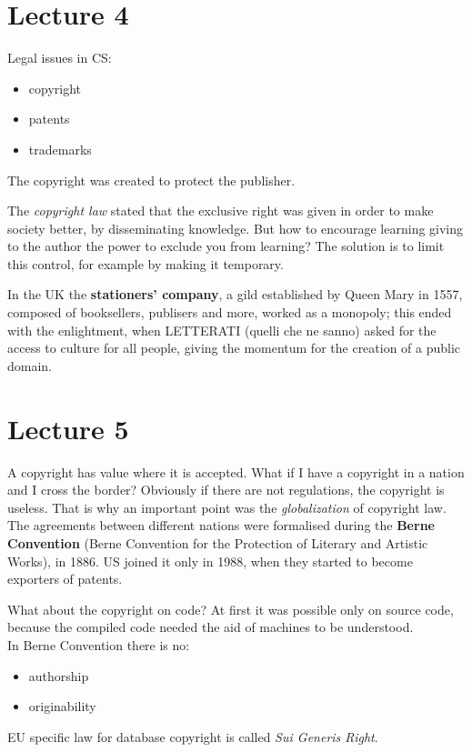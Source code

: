 \documentclass[a4paper, 10pt, titlepage]{article}
\begin{document}
\section{Lecture 4}
Legal issues in CS:
\begin{itemize}
\item copyright
\item patents
\item trademarks
\end{itemize}
The copyright was created to protect the publisher. 

The \textit{copyright law} stated that the exclusive right was given in order to make society better, by disseminating knowledge. But how to encourage learning giving to the author the power to exclude you from learning? The solution is to limit this control, for example by making it temporary.

In the UK the \textbf{stationers' company}, a gild established by Queen Mary in 1557, composed of booksellers, publisers and more, worked as a monopoly; this ended with the enlightment, when LETTERATI (quelli che ne sanno) asked for the access to culture for all people, giving the momentum for the creation of a public domain.

\section{Lecture 5}
A copyright has value where it is accepted. What if I have a copyright in a nation and I cross the border? Obviously if there are not regulations, the copyright is useless. That is why an important point was the \textit{globalization} of copyright law. The agreements between different nations were formalised during the \textbf{Berne Convention} (Berne Convention for the Protection of Literary and Artistic Works), in 1886. US joined it only in 1988, when they started to become exporters of patents.

What about the copyright on code? At first it was possible only on source code, because the compiled code needed the aid of machines to be understood. \medskip \\
In Berne Convention there is no:
\begin{itemize}
\item authorship
\item originability
\end{itemize} \medskip
EU specific law for database copyright is called \textit{Sui Generis Right}.
\end{document}
